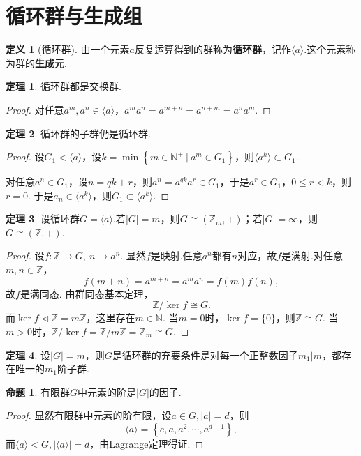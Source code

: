 \documentclass[12pt]{ctexart}
\theoremstyle{definition}
\newtheorem{definition}{定义}[section]
\newtheorem{theorem}{定理}[section]
\newtheorem{proposition}{命题}[section]
\theoremstyle{plain}
\begin{document}
\section{循环群与生成组}
\begin{definition}[循环群]
	由一个元素$a$反复运算得到的群称为\textbf{循环群}，记作$\langle a\rangle$.这个元素称为群的\textbf{生成元}.
\end{definition}
\begin{theorem}
	循环群都是交换群.
\end{theorem}
\begin{proof}
	对任意$a^m,a^n\in\langle a\rangle$，$a^ma^n=a^{m+n}=a^{n+m}=a^na^m$.
\end{proof}
\begin{theorem}
	循环群的子群仍是循环群.
\end{theorem}
\begin{proof}
	设$G_1<\langle a\rangle$，设$k=\min\left\{m\in\mathbb{N}^{+}\ |\ a^m\in G_1\right\}$，则$\langle a^k\rangle\subset G_1$.
	
	对任意$a^n\in G_1$，设$n=qk+r$，则$a^n=a^{qk}a^r\in G_1$，于是$a^r\in G_1$，$0\leqslant r<k$，则$r=0$. 于是$a_n\in\langle a^k\rangle$，则$G_1\subset\langle a^k\rangle$.
\end{proof}
\begin{theorem}
	设循环群$G=\langle a\rangle$.若$|G|=m$，则$G\cong(\mathbb{Z}_m,+)$；若$|G|=\infty$，则$G\cong(\mathbb{Z},+)$.
\end{theorem}
\begin{proof}
	设$f:\mathbb{Z}\to G,\ n\to a^n$. 显然$f$是映射.任意$a^n$都有$n$对应，故$f$是满射.对任意$m,n\in\mathbb{Z}$，
	$$f(m+n)=a^{m+n}=a^ma^n=f(m)f(n),$$
	故$f$是满同态. 由群同态基本定理，
	$$\mathbb{Z}/\ker f\cong G.$$
	而$\ker f\lhd\mathbb{Z}=m\mathbb{Z}$，这里存在$m\in\mathbb{N}$. 当$m=0$时，$\ker f=\{0\}$，则$\mathbb{Z}\cong G$. 当$m>0$时，$\mathbb{Z}/\ker f=\mathbb{Z}/m\mathbb{Z}=\mathbb{Z}_m\cong G$.
\end{proof}
\begin{theorem}
	设$|G|=m$，则$G$是循环群的充要条件是对每一个正整数因子$m_1|m$，都存在唯一的$m_1$阶子群.
\end{theorem}
\begin{proposition}\label{ord}
	有限群$G$中元素的阶是$|G|$的因子.
\end{proposition}
\begin{proof}
	显然有限群中元素的阶有限，设$a\in G,|a|=d$，则
	$$\langle a\rangle=\left\{e,a,a^2,\cdots,a^{d-1}\right\},$$
	而$\langle a\rangle<G,|\langle a\rangle|=d$，由Lagrange定理得证.
\end{proof}
\end{document}
